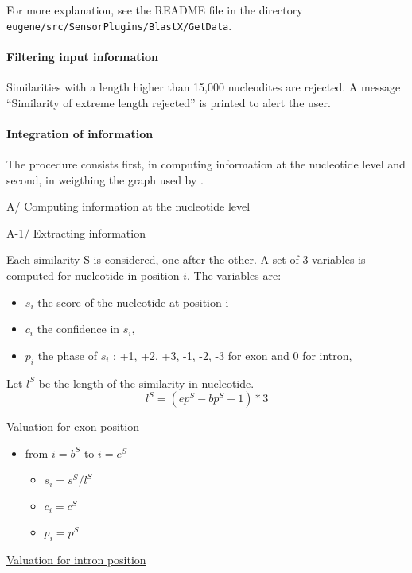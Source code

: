 For more explanation, see the README file in the directory
\texttt{eugene/src/SensorPlugins/BlastX/GetData}.

\paragraph{Filtering input information}

Similarities with a length higher than 15,000 nucleodites are
rejected. A message ``Similarity of extreme length rejected'' is
printed to alert the user.

\paragraph{Integration of information}

The procedure consists first, in computing information at the
nucleotide level and second, in weigthing the graph used by \EuGene.

A/ Computing information at the nucleotide level

A-1/ Extracting information

Each similarity S is considered, one after the other.  A set of 3
variables is computed for nucleotide in position $i$. The variables
are:
\begin{itemize}
\item $s_i$ the score of the nucleotide at position i
\item $c_i$ the confidence in $s_i$,
\item $p_i$ the phase of $s_i$ : +1, +2, +3, -1, -2, -3 for exon and 0 for intron,
\end{itemize}
Let $l^S$ be the length of the similarity in nucleotide.
\[l^S = (ep^S -bp^S -1)*3\]

\underline{Valuation for exon position} \\

\begin{itemize}
\item from $i = b^S$ to  $i = e^S$
  \begin{itemize}
  \item $s_i = s^S / l^S$
  \item $c_i = c^S$
  \item $p_i = p^S$
  \end{itemize}
\end{itemize}

\underline{Valuation for intron position}\\

